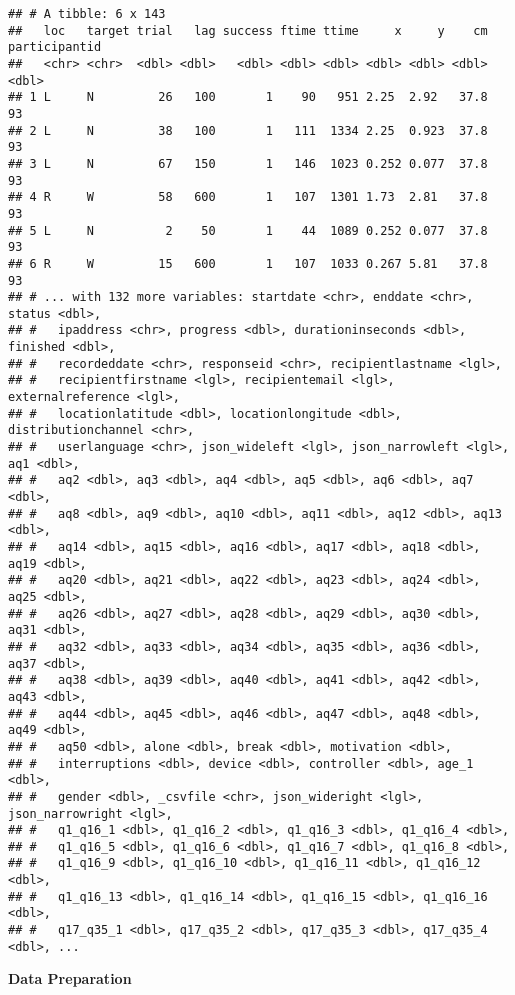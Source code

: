 \documentclass[
]{article}
\begin{document}
\begin{verbatim}
## # A tibble: 6 x 143
##   loc   target trial   lag success ftime ttime     x     y    cm participantid
##   <chr> <chr>  <dbl> <dbl>   <dbl> <dbl> <dbl> <dbl> <dbl> <dbl>         <dbl>
## 1 L     N         26   100       1    90   951 2.25  2.92   37.8            93
## 2 L     N         38   100       1   111  1334 2.25  0.923  37.8            93
## 3 L     N         67   150       1   146  1023 0.252 0.077  37.8            93
## 4 R     W         58   600       1   107  1301 1.73  2.81   37.8            93
## 5 L     N          2    50       1    44  1089 0.252 0.077  37.8            93
## 6 R     W         15   600       1   107  1033 0.267 5.81   37.8            93
## # ... with 132 more variables: startdate <chr>, enddate <chr>, status <dbl>,
## #   ipaddress <chr>, progress <dbl>, durationinseconds <dbl>, finished <dbl>,
## #   recordeddate <chr>, responseid <chr>, recipientlastname <lgl>,
## #   recipientfirstname <lgl>, recipientemail <lgl>, externalreference <lgl>,
## #   locationlatitude <dbl>, locationlongitude <dbl>, distributionchannel <chr>,
## #   userlanguage <chr>, json_wideleft <lgl>, json_narrowleft <lgl>, aq1 <dbl>,
## #   aq2 <dbl>, aq3 <dbl>, aq4 <dbl>, aq5 <dbl>, aq6 <dbl>, aq7 <dbl>,
## #   aq8 <dbl>, aq9 <dbl>, aq10 <dbl>, aq11 <dbl>, aq12 <dbl>, aq13 <dbl>,
## #   aq14 <dbl>, aq15 <dbl>, aq16 <dbl>, aq17 <dbl>, aq18 <dbl>, aq19 <dbl>,
## #   aq20 <dbl>, aq21 <dbl>, aq22 <dbl>, aq23 <dbl>, aq24 <dbl>, aq25 <dbl>,
## #   aq26 <dbl>, aq27 <dbl>, aq28 <dbl>, aq29 <dbl>, aq30 <dbl>, aq31 <dbl>,
## #   aq32 <dbl>, aq33 <dbl>, aq34 <dbl>, aq35 <dbl>, aq36 <dbl>, aq37 <dbl>,
## #   aq38 <dbl>, aq39 <dbl>, aq40 <dbl>, aq41 <dbl>, aq42 <dbl>, aq43 <dbl>,
## #   aq44 <dbl>, aq45 <dbl>, aq46 <dbl>, aq47 <dbl>, aq48 <dbl>, aq49 <dbl>,
## #   aq50 <dbl>, alone <dbl>, break <dbl>, motivation <dbl>,
## #   interruptions <dbl>, device <dbl>, controller <dbl>, age_1 <dbl>,
## #   gender <dbl>, _csvfile <chr>, json_wideright <lgl>, json_narrowright <lgl>,
## #   q1_q16_1 <dbl>, q1_q16_2 <dbl>, q1_q16_3 <dbl>, q1_q16_4 <dbl>,
## #   q1_q16_5 <dbl>, q1_q16_6 <dbl>, q1_q16_7 <dbl>, q1_q16_8 <dbl>,
## #   q1_q16_9 <dbl>, q1_q16_10 <dbl>, q1_q16_11 <dbl>, q1_q16_12 <dbl>,
## #   q1_q16_13 <dbl>, q1_q16_14 <dbl>, q1_q16_15 <dbl>, q1_q16_16 <dbl>,
## #   q17_q35_1 <dbl>, q17_q35_2 <dbl>, q17_q35_3 <dbl>, q17_q35_4 <dbl>, ...
\end{verbatim}

\textbf{Data Preparation}
\end{document}
